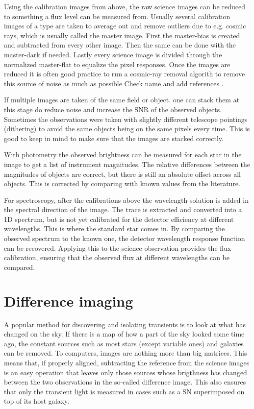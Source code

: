 \documentclass[a4paper,oneside,12pt, class=Latex/Classes/PhDthesisPSnPDF, crop=false]{standalone}
\begin{document}
Using the calibration images from above, the raw science images can be reduced to something a flux level can be measured from. Usually several calibration images of a type are taken to average out and remove outliers due to e.g. cosmic rays, which is usually called the master image. First the master-bias is created and subtracted from every other image. Then the same can be done with the master-dark if needed. Lastly every science image is divided through the normalized master-flat to equalize the pixel responses. Once the images are reduced it is often good practice to run a cosmic-ray removal algorith to remove this source of noise as much as possible \color{red} Check name and add references \color{black}.

If multiple images are taken of the same field or object. one can stack them at this stage do reduce noise and increase the SNR of the observed objects. Sometimes the observations were taken with slightly different telescope pointings (dithering) to avoid the same objects being on the same pixels every time. This is good to keep in mind to make sure that the images are stacked correctly.

With photometry the observed brightness can be measured for each star in the image to get a list of instrument magnitudes. The relative differences between the magnitudes of objects are correct, but there is still an absolute offset across all objects. This is corrected by comparing with known values from the literature.

For spectroscopy, after the calibrations above the wavelength solution is added in the spectral direction of the image. The trace is extracted and converted into a 1D spectrum, but is not yet calibrated for the detector efficiency at different wavelengths. This is where the standard star comes in. By comparing the observed spectrum to the known one, the detector wavelength response function can be recovered. Applying this to the science observation provides the flux calibration, ensuring that the observed flux at different wavelengths can be compared.

\section{Difference imaging}
A popular method for discovering and isolating transients is to look at what has changed on the sky. If there is a map of how a part of the sky looked some time ago, the constant sources such as most stars (except variable ones) and galaxies can be removed. To computers, images are nothing more than big matrices. This means that, if properly aligned, subtracting the reference from the science images is an easy operation that leaves only those sources whose brigthness has changed between the two observations in the so-called difference image. This also ensures that only the transient light is measured in cases such as a SN superimposed on top of its host galaxy.
\end{document}
